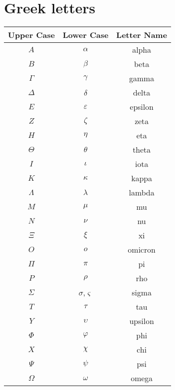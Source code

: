 \chapter{Greek letters}

\begin{center}
	\begin{tabular}{c | c | c}
		Upper Case & Lower Case & Letter Name\\
		\hline
		$A$ 		& $\alpha $ 				& alpha\\
		$B$ 		& $\beta $ 					& beta\\
		$\Gamma $ 	& $\gamma $ 				& gamma\\
		$\Delta $ 	& $\delta $ 				& delta\\
		$E$ 		& $\varepsilon $ 			& epsilon\\
		$Z$ 		& $\zeta $ 					& zeta\\
		$H$ 		& $\eta $ 					& eta\\
		$\Theta $ 	& $\theta $ 				& theta\\
		$I$ 		& $\iota $ 					& iota\\
		$K$ 		& $\kappa $ 				& kappa\\
		$\Lambda $ 	& $\lambda $ 				& lambda\\
		$M$ 		& $\mu $ 					& mu\\
		$N$ 		& $\nu $ 					& nu\\
		$\Xi $ 		& $\xi $ 					& xi\\
		$O$ 		& $o$ 						& omicron\\
		$\Pi $ 		& $\pi $ 					& pi\\
		$P$ 		& $\rho $ 					& rho\\
		$\Sigma $ 	& $\sigma $,$\varsigma $ 	& sigma\\
		$T$ 		& $\tau $ 					& tau\\
		$Y$ 		& $\upsilon $ 				& upsilon\\
		$\Phi $ 	& $\varphi $ 				& phi\\
		$X$ 		& $\chi $ 					& chi\\
		$\Psi $ 	& $\psi $ 					& psi\\
		$\Omega $ 	& $\omega $ 				& omega\\
	\end{tabular}
\end{center}